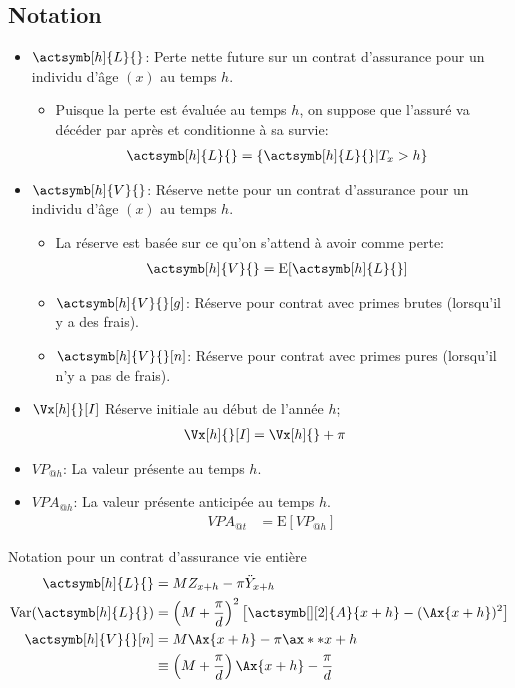 \documentclass[10pt, french]{article}
\begin{document}
\begin{multicols*}{2}
\subsection{Notation}
\begin{itemize}[leftmargin = *]
	\item[] 	$\actsymb[h]{L}{}$: Perte nette future sur un contrat d'assurance pour un individu d'âge $(x)$ au temps $h$.
		\begin{itemize}[leftmargin = *]
		\item	Puisque la perte est évaluée au temps $h$, on suppose que l'assuré va décéder par après et conditionne à sa survie:
			\begin{align*}
			\actsymb[h]{L}{}	
			&=	\{ \actsymb[h]{L}{} | T_{x} > h \}
			\end{align*}
		\end{itemize}
	\item[]	$\actsymb[h]{V}{}$: Réserve nette pour un contrat d'assurance pour un individu d'âge $(x)$ au temps $h$.
		\begin{itemize}[leftmargin = *]
		\item	La réserve est basée sur ce qu'on s'attend à avoir comme perte:
			\begin{align*}
			\actsymb[h]{V}{}	
			&=	\text{E}[\actsymb[h]{L}{}]	
			\end{align*}
		\item[]	$\actsymb[h]{V}{}[g]$: Réserve pour contrat avec primes brutes (lorsqu'il y a des frais).
		\item[]	$\actsymb[h]{V}{}[n]$: Réserve pour contrat avec primes pures (lorsqu'il n'y a pas de frais).
		\end{itemize}
	\item[]	$\Vx[h]{}[I]$	Réserve initiale au début de l'année $h$;
		\begin{align*}
		\Vx[h]{}[I]	&=	\Vx[h]{} + \pi
		\end{align*}
	\item[]	$VP_{@h}$: La valeur présente au temps $h$.
	\item[]	$VPA_{@h}$: La valeur présente anticipée au temps $h$.
		\begin{align*}
		VPA_{@t}	
		&=	\text{E}[VP_{@h}]
		\end{align*}
\end{itemize}

\begin{examplebox}{Notation pour un contrat d'assurance vie entière}
\begin{align*}
	\actsymb[h]{L}{}	
	&=	M Z_{x + h} - \pi \ddot{Y}_{x + h}	\\
	\text{Var}(\actsymb[h]{L}{})
	&=	\left(M + \frac{\pi}{d}\right)^{2} \left[ \actsymb[][2]{A}{x + h} - (\Ax{x + h})^{2} \right]	\\
	\actsymb[h]{V}{}[n]	
	&=	M \Ax{x + h} - \pi \ax**{x + h}	\\
	&\equiv	\left(M + \frac{\pi}{d}\right) \Ax{x + h} - \frac{\pi}{d}
\end{align*}


\end{examplebox}
\end{multicols*}
\end{document}
